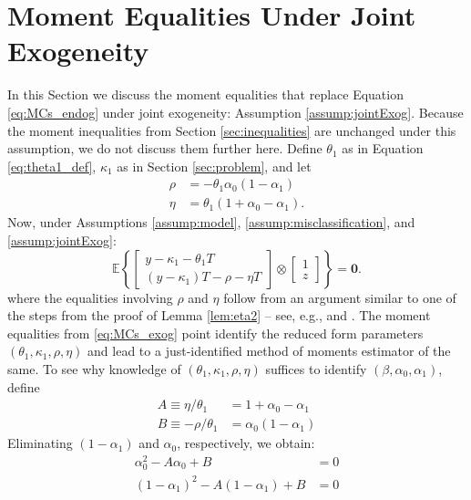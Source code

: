 \section{Moment Equalities Under Joint Exogeneity}
\label{sec:FL_mahajan}
In this Section we discuss the moment equalities that replace Equation \ref{eq:MCs_endog} under joint exogeneity: Assumption \ref{assump:jointExog}.
Because the moment inequalities from Section \ref{sec:inequalities} are unchanged under this assumption, we do not discuss them further here.
Define $\theta_1$ as in Equation \ref{eq:theta1_def}, $\kappa_1$ as in Section \ref{sec:problem}, and let
\begin{align*}
  \rho &= -\theta_1 \alpha_0 (1 - \alpha_1)\\
  \eta &= \theta_1 (1 + \alpha_0 - \alpha_1).
\end{align*}
Now, under Assumptions \ref{assump:model}, \ref{assump:misclassification}, and \ref{assump:jointExog}:
\begin{equation}
  \mathbb{E}\left\{ \left[
    \begin{array}{c}
    y - \kappa_1 - \theta_1 T \\
    (y - \kappa_1)T - \rho - \eta T
  \end{array}
\right] \otimes \left[
\begin{array}{c}
1 \\ z
\end{array}
\right]\right\} = \mathbf{0}.
\label{eq:MCs_exog}
\end{equation}
where the equalities involving $\rho$ and $\eta$ follow from an argument similar to one of the steps from the proof of Lemma \ref{lem:eta2} -- see, e.g., \cite{FL} and \cite{Mahajan}.
The moment equalities from \ref{eq:MCs_exog} point identify the reduced form parameters $(\theta_1, \kappa_1, \rho,\eta)$ and lead to a just-identified method of moments estimator of the same.
To see why knowledge of $(\theta_1, \kappa_1, \rho,\eta)$ suffices to identify $(\beta, \alpha_0, \alpha_1)$, define
\begin{align*}
  A \equiv \eta/\theta_1 &= 1 + \alpha_0 - \alpha_1 \\
  B \equiv -\rho/\theta_1 &= \alpha_0 (1 - \alpha_1)
\end{align*}
Eliminating $(1 - \alpha_1)$ and $\alpha_0$, respectively, we obtain:
\begin{align*}
  \alpha_0^2 - A\alpha_0 + B &= 0\\
  (1 - \alpha_1)^2 - A(1 - \alpha_1) + B &= 0
\end{align*}

